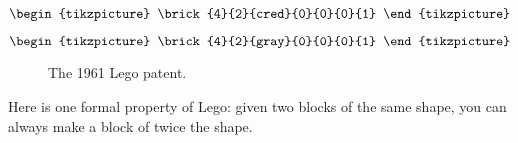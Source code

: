 \begin{forslides}
\begin{equation}\label{eq:lego-red3}
\begin{tikzpicture}
  \brick{4}{2}{cred}{0}{0}{0}{1} %
\end{tikzpicture}
\end{equation}


\begin{equation}\label{eq:lego-gray3}
\begin{tikzpicture}
  \brick{4}{2}{gray}{0}{0}{0}{1} %
\end{tikzpicture}
\end{equation}
\end{forslides}


\begin{figure*}[p]
  \centering
%
  \caption{The 1961 Lego patent.}
\end{figure*}
Here is one formal property of Lego: given two blocks of the same shape, you can always make a block of twice the shape.

